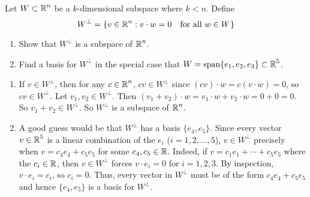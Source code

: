 \documentclass{ximera}
\author{Matthew Carr}
\begin{document}

\begin{exercise}\label{mc.exercise11}

Let $W\subset \mbox{$\Bbb{R}$}^n$ be a $k$-dimensional subspace where $k<n$.  Define
\[
W^\perp = \{v\in\mbox{$\Bbb{R}$}^n: v\cdot w = 0\quad \mbox{for all $w\in W$} \}
\]
\begin{enumerate}
\item Show that $W^\perp$ is a subspace of $\mbox{$\Bbb{R}$}^n$.
\item Find a basis for $W^\perp$ in the special case that $W = \mathrm{span}\{e_1,e_2,e_3\}\subset\mbox{$\Bbb{R}$}^5$.

\end{enumerate}

  
\begin{solution}


\soln \begin{enumerate}
\item If $v\in W^\perp$, then for any $c\in\mbox{$\Bbb{R}$}^n$, $cv\in W^\perp$ since $(cv)\cdot w=c(v\cdot w)=0$, so $cv\in W^\perp$. Let $v_1,v_2\in W^\perp$. Then $(v_1+v_2)\cdot w=v_1\cdot w+v_2\cdot w=0+0=0$. So $v_1+v_2\in W^\perp$. So $W^\perp$ is a subspace of $\mbox{$\Bbb{R}$}^n$.
\item A good guess would be that $W^\perp$ has a basis $\{e_4,e_5\}$. Since every vector $v\in\mbox{$\Bbb{R}$}^5$ is a linear combination of the $e_i$ ($i=1,2,\ldots,5$), $v\in W^\perp$ precisely when $v=c_4 e_4+c_5 e_5$ for some $c_4,c_5\in\mbox{$\Bbb{R}$}$. Indeed, if $v=c_1e_1+\cdots+c_5e_5$ where the $c_i\in\mbox{$\Bbb{R}$}$, then $v\in W^\perp$ forces $v\cdot e_i=0$ for $i=1,2,3$. By inspection, $v\cdot e_i=c_i$, so $c_i=0$. Thus, every vector in $W^\perp$ must be of the form $c_4 e_4+c_5 e_5$ and hence $\{e_4,e_5\}$ is a basis for $W^\perp$. 
\end{enumerate}


\end{solution}
\end{exercise}
\end{document}
